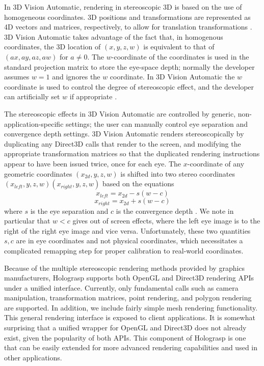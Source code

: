 \documentclass[pageno]{jpaper}
\begin{document}
In 3D Vision Automatic, rendering in stereoscopic 3D is based on the use of homogeneous coordinates. 3D positions and transformations are represented
as 4D vectors and matrices, respectively, to allow for translation transformations \cite{graphicstextbook}. 3D Vision Automatic takes advantage of the
fact that, in homogenous coordinates, the 3D location of $(x, y, z, w)$ is equivalent to that of $(ax, ay, az, aw)$ for $a \ne 0$. The $w$-coordinate
of the coordinates is used in the standard projection matrix to store the eye-space depth; normally the developer assumes
$w=1$ and ignores the $w$ coordinate. In 3D Vision Automatic the $w$ coordinate is used to control the degree of stereoscopic effect, and the
developer can artificially set $w$ if appropriate \cite{nvidia3dvision}.

The stereoscopic effects in 3D Vision Automatic are controlled by generic, non-application-specific settings; the user can manually control
eye separation and convergence depth settings.
3D Vision Automatic renders stereoscopically by duplicating any Direct3D calls that render to the screen, and modifying the appropriate
transformation matrices so that the duplicated rendering instructions appear to have been issued twice, once for each eye. The $x$-coordinate of any geometric
coordinates $(x_{2d}, y, z, w)$ is shifted into two stereo coordinates $(x_{left}, y, z, w)(x_{right}, y, z, w)$ based on the equations
$$x_{left} = x_{2d} - s(w - c)$$
$$x_{right} = x_{2d} + s(w - c)$$
where $s$ is the eye separation and $c$ is the convergence depth \cite{nvidia3dvision}. We note in particular that $w<c$ gives out of screen effects, where
the left eye image is to the right of the right eye image and vice versa. Unfortunately, these two quantities $s, c$ are in eye coordinates and not
physical coordinates, which necessitates a complicated remapping step for proper calibration to real-world coordinates.

Because of the multiple stereoscopic rendering methods provided by graphics manufacturers, Holograsp supports both OpenGL and Direct3D rendering APIs under a unified interface.
Currently, only fundamental calls such as camera manipulation, transformation matrices, point rendering, and polygon rendering are supported. In addition,
we include fairly simple mesh rendering functionality. This general rendering interface is exposed to client applications. It is somewhat surprising that
a unified wrapper for OpenGL and Direct3D does not already exist, given the popularity of both APIs. This component of Holograsp is one that can be easily extended for
more advanced rendering capabilities and used in other applications.
\end{document}

